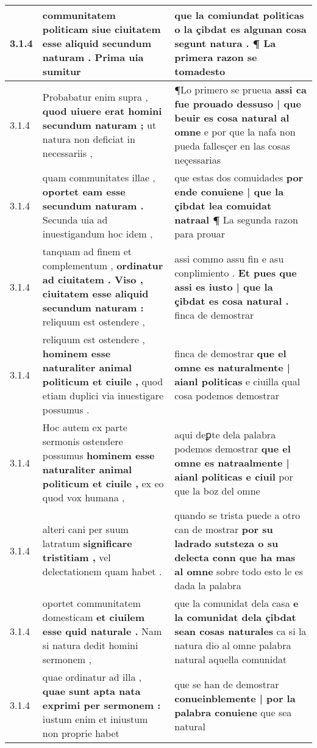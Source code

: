 \begin{tabular}{|p{1cm}|p{6.5cm}|p{6.5cm}|}
3.1.4 & communitatem politicam \textbf{ siue ciuitatem esse aliquid secundum naturam . } Prima uia sumitur & que la comiundat politicas \textbf{ o la çibdat es algunan cosa segunt natura . } ¶ La primera razon se tomadesto \\\hline
3.1.4 & Probabatur enim supra , \textbf{ quod uiuere erat homini secundum naturam ; } ut natura non deficiat in necessariis , & ¶Lo primero se prueua \textbf{ assi ca fue prouado dessuso | que beuir es cosa natural al omne } e por que la nafa non pueda fallesçer en las cosas neçessarias \\\hline
3.1.4 & quam communitates illae , \textbf{ oportet eam esse secundum naturam . } Secunda uia ad inuestigandum hoc idem , & que estas dos comuidades \textbf{ por ende conuiene | que la çibdat lea comuidat natraal ¶ } La segunda razon para prouar \\\hline
3.1.4 & tanquam ad finem et complementum , \textbf{ ordinatur ad ciuitatem . Viso , ciuitatem esse aliquid secundum naturam : } reliquum est ostendere , & assi commo assu fin e asu conplimiento . \textbf{ Et pues que assi es iusto | que la çibdat es cosa natural . } finca de demostrar \\\hline
3.1.4 & reliquum est ostendere , \textbf{ hominem esse naturaliter animal politicum et ciuile , } quod etiam duplici via inuestigare possumus . & finca de demostrar \textbf{ que el omne es naturalmente | aianl politicas } e ciuilla qual cosa podemos demostrar \\\hline
3.1.4 & Hoc autem ex parte sermonis ostendere possumus \textbf{ hominem esse naturaliter animal politicum et ciuile , } ex eo quod vox humana , & aqui deꝑte dela palabra podemos demostrar \textbf{ que el omne es natraalmente | aianl politicas e ciuil } por que la boz del omne \\\hline
3.1.4 & alteri cani per suum latratum \textbf{ significare tristitiam , } vel delectationem quam habet . & quando se trista puede a otro can de mostrar \textbf{ por su ladrado sutsteza o su delecta conn que ha mas al omne } sobre todo esto le es dada la palabra \\\hline
3.1.4 & oportet communitatem domesticam \textbf{ et ciuilem esse quid naturale . } Nam si natura dedit homini sermonem , & que la comunidat dela casa \textbf{ e la comunidat dela çibdat sean cosas naturales } ca si la natura dio al omne palabra natural aquella comunidat \\\hline
3.1.4 & quae ordinatur ad illa , \textbf{ quae sunt apta nata exprimi per sermonem : } iustum enim et iniustum non proprie habet & que se han de demostrar \textbf{ conueinblemente | por la palabra conuiene } que sea natural \\\hline

\end{tabular}
